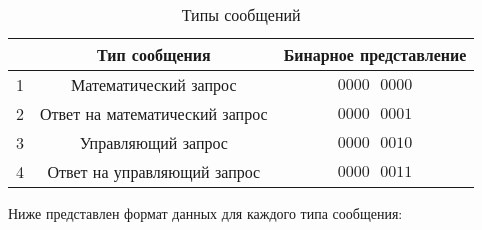 \begin{table}[H]
\begin{center}
	\caption{Типы сообщений}
	\label{tab:msg-types}
	\def\tabcolsep{10pt}
	\def\arraystretch{1.23}
	\begin{tabular}{|c|c|c|}
		\hline 
		& Тип сообщения & Бинарное представление \\ 
		\hline 
		1 & Математический запрос & $0000\text{ }0000$ \\ 
		\hline 
		2 & Ответ на математический запрос & $0000\text{ }0001$ \\ 
		\hline 
		3 & Управляющий запрос & $0000\text{ }0010$ \\ 
		\hline 
		4 & Ответ на управляющий запрос & $0000\text{ }0011$ \\ 
		\hline 
	\end{tabular} 
\end{center}
\end{table}

Ниже представлен формат данных для каждого типа сообщения:

